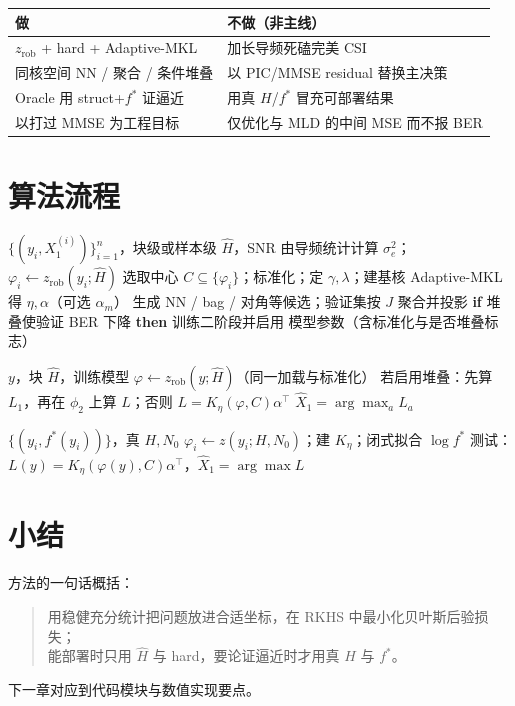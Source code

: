 \begin{center}
\begin{tabular}{ll}
\toprule
做 & 不做（非主线） \\
\midrule
$z_{\mathrm{rob}}$ + hard + Adaptive-MKL & 加长导频死磕完美 CSI \\
同核空间 NN / 聚合 / 条件堆叠 & 以 PIC/MMSE residual 替换主决策 \\
Oracle 用 struct+$f^*$ 证逼近 & 用真 $H$/$f^*$ 冒充可部署结果 \\
以打过 MMSE 为工程目标 & 仅优化与 MLD 的中间 MSE 而不报 BER \\
\bottomrule
\end{tabular}
\end{center}

\section{算法流程}

\begin{algorithm}[H]
\caption{可部署 RKHS 检测器：训练}
\begin{algorithmic}[1]
\Require $\{(y_i,X_1^{(i)})\}_{i=1}^n$，块级或样本级 $\hat H$，SNR
\State 由导频统计计算 $\sigma_e^2$；$\varphi_i\gets z_{\mathrm{rob}}(y_i;\hat H)$
\State 选取中心 $C\subseteq\{\varphi_i\}$；标准化；定 $\gamma,\lambda$；建基核
\State Adaptive-MKL 得 $\eta,\alpha$（可选 $\alpha_m$）
\State 生成 NN / bag / 对角等候选；验证集按 $J$ 聚合并投影
\State \textbf{if} 堆叠使验证 BER 下降 \textbf{then} 训练二阶段并启用
\State \Return 模型参数（含标准化与是否堆叠标志）
\end{algorithmic}
\end{algorithm}

\begin{algorithm}[H]
\caption{可部署 RKHS 检测器：测试}
\begin{algorithmic}[1]
\Require $y$，块 $\hat H$，训练模型
\State $\varphi\gets z_{\mathrm{rob}}(y;\hat H)$（同一加载与标准化）
\State 若启用堆叠：先算 $L_1$，再在 $\phi_2$ 上算 $L$；否则 $L=K_\eta(\varphi,C)\alpha^\top$
\State \Return $\hat X_1=\arg\max_a L_a$
\end{algorithmic}
\end{algorithm}

\begin{algorithm}[H]
\caption{RKHS Oracle（上界）}
\begin{algorithmic}[1]
\Require $\{(y_i,f^*(y_i))\}$，真 $H,N_0$
\State $\varphi_i\gets z(y_i;H,N_0)$；建 $K_\eta$；闭式拟合 $\log f^*$
\State 测试：$L(y)=K_\eta(\varphi(y),C)\alpha^\top$，$\hat X_1=\arg\max L$
\end{algorithmic}
\end{algorithm}

\section{小结}

方法的一句话概括：
\begin{quote}
用稳健充分统计把问题放进合适坐标，在 RKHS 中最小化贝叶斯后验损失；\\
能部署时只用 $\hat H$ 与 hard，要论证逼近时才用真 $H$ 与 $f^*$。
\end{quote}
下一章对应到代码模块与数值实现要点。

